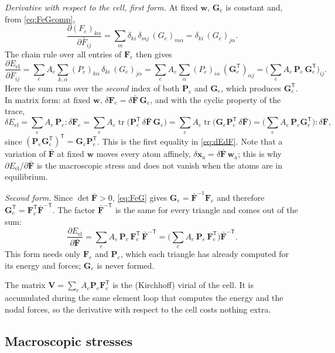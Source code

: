 \documentclass[11pt,a4paper]{article}
\newcommand{\Fb}{\bar{\mathbf F}}
\newcommand{\F}{\mathbf F}
\newcommand{\Pk}{\mathbf P}
\newcommand{\x}{\mathbf x}
\newcommand{\w}{\mathbf w}
\newcommand{\G}{\mathbf G}
\newcommand{\tr}{\operatorname{tr}}
\begin{document}
\emph{Derivative with respect to the cell, first form.} At fixed \(\w\), \(\G_e\) is constant and, from
\eqref{eq:FeGcomp},
\begin{equation}
  \frac{\partial(F_e)_{k\alpha}}{\partial\bar F_{ij}}
  =\sum_m\delta_{ki}\,\delta_{mj}\,(G_e)_{m\alpha}=\delta_{ki}\,(G_e)_{j\alpha}.
  \label{eq:dFedFb}
\end{equation}
The chain rule over all entries of \(\F_e\) then gives
\begin{equation}
  \frac{\partial E_{\mathrm{el}}}{\partial\bar F_{ij}}
  =\sum_eA_e\sum_{k,\alpha}(P_e)_{k\alpha}\,\delta_{ki}\,(G_e)_{j\alpha}
  =\sum_eA_e\sum_\alpha(P_e)_{i\alpha}\,(\G_e^{\mathsf T})_{\alpha j}
  =\Big(\sum_eA_e\,\Pk_e\,\G_e^{\mathsf T}\Big)_{ij}.
\end{equation}
Here the sum runs over the \emph{second} index of both \(\Pk_e\) and \(\G_e\), which produces
\(\G_e^{\mathsf T}\). In matrix form: at fixed \(\w\), \(\delta\F_e=\delta\Fb\,\G_e\), and with the cyclic
property of the trace,
\[
  \delta E_{\mathrm{el}}=\sum_eA_e\,\Pk_e:\delta\F_e
  =\sum_eA_e\tr\!\big(\Pk_e^{\mathsf T}\,\delta\Fb\,\G_e\big)
  =\sum_eA_e\tr\!\big(\G_e\Pk_e^{\mathsf T}\,\delta\Fb\big)
  =\Big(\sum_eA_e\,\Pk_e\G_e^{\mathsf T}\Big):\delta\Fb ,
\]
since \((\Pk_e\G_e^{\mathsf T})^{\mathsf T}=\G_e\Pk_e^{\mathsf T}\). This is the first equality in
\eqref{eq:dEdF}. Note that a variation of \(\Fb\) at fixed \(\w\) moves every atom affinely,
\(\delta\x_a=\delta\Fb\,\w_a\); this is why \(\partial E_{\mathrm{el}}/\partial\Fb\) is the macroscopic
stress and does not vanish when the atoms are in equilibrium.

\emph{Second form.} Since \(\det\Fb>0\), \eqref{eq:FeG} gives \(\G_e=\Fb^{-1}\F_e\) and therefore
\(\G_e^{\mathsf T}=\F_e^{\mathsf T}\Fb^{-\mathsf T}\). The factor \(\Fb^{-\mathsf T}\) is the same for every
triangle and comes out of the sum:
\[
  \frac{\partial E_{\mathrm{el}}}{\partial\Fb}
  =\sum_eA_e\,\Pk_e\,\F_e^{\mathsf T}\,\Fb^{-\mathsf T}
  =\Big(\sum_eA_e\,\Pk_e\,\F_e^{\mathsf T}\Big)\Fb^{-\mathsf T}.
\]
This form needs only \(\F_e\) and \(\Pk_e\), which each triangle has already computed for its energy and
forces; \(\G_e\) is never formed.

The matrix \(\mathbf V=\sum_e A_e\Pk_e\F_e^{\mathsf T}\) is the (Kirchhoff) virial of the cell. It
is accumulated during the same element loop that computes the energy and the nodal forces, so the
derivative with respect to the cell costs nothing extra.

\subsection{Macroscopic stresses}
\end{document}
